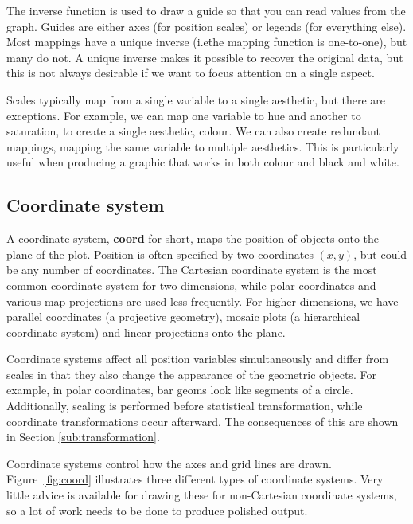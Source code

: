 The inverse function is used to draw a guide so that you can read values from the graph.  Guides are either axes (for position scales) or legends (for everything else).  Most mappings have a unique inverse (i.e\. the mapping function is one-to-one), but many do not.  A unique inverse makes it possible to recover the original data, but this is not always desirable if we want to focus attention on a single aspect.

Scales typically map from a single variable to a single aesthetic, but there are exceptions.  For example, we can map one variable to hue and another to saturation, to create a single aesthetic, colour.  We can also create redundant mappings, mapping the same variable to multiple aesthetics.  This is particularly useful when producing a graphic that works in both colour and black and white. 

\subsection{Coordinate system}\label{sec:coordinate_systems}

A coordinate system, {\bf coord} for short, maps the position of objects onto the plane of the plot.  Position is often specified by two coordinates $(x, y)$, but could be any number of coordinates.  The Cartesian coordinate system is the most common coordinate system for two dimensions, while polar coordinates and various map projections are used less frequently.  For higher dimensions, we have parallel coordinates (a projective geometry), mosaic plots (a hierarchical coordinate system) and linear projections onto the plane.

Coordinate systems affect all position variables simultaneously and differ from scales in that they also change the appearance of the geometric objects.  For example, in polar coordinates, bar geoms look like segments of a circle.  Additionally, scaling is performed before statistical transformation, while coordinate transformations occur afterward.  The consequences of this are shown in Section \ref{sub:transformation}.

Coordinate systems control how the axes and grid lines are drawn.  Figure~\ref{fig:coord} illustrates three different types of coordinate systems.  Very little advice is available for drawing these for non-Cartesian coordinate systems, so a lot of work needs to be done to produce polished output.


